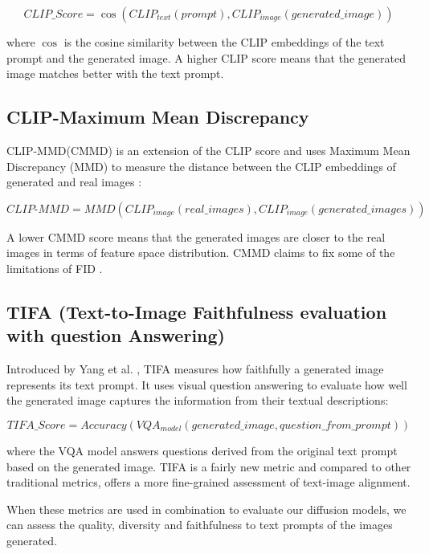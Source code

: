\documentclass{article}
\begin{document}
\begin{equation}
    CLIP\_Score = \cos(CLIP_{text}(prompt), CLIP_{image}(generated\_image))
\end{equation}

where $\cos$ is the cosine similarity between the CLIP embeddings of the text prompt and the generated image.
A higher CLIP score means that the generated image matches better with the text prompt.

\subsection{CLIP-Maximum Mean Discrepancy}

CLIP-MMD(CMMD) is an extension of the CLIP score and uses Maximum Mean Discrepancy (MMD) to measure the distance between the 
CLIP embeddings of generated and real images \cite{gao2022measuring}:

\begin{equation}
    CLIP\text{-}MMD = MMD(CLIP_{image}(real\_images), CLIP_{image}(generated\_images))
\end{equation}

A lower CMMD score means that the generated images are closer to the real images in terms of feature space distribution. CMMD claims to 
fix some of the limitations of FID \cite{rethinkingFID2024}.

\subsection{TIFA (Text-to-Image Faithfulness evaluation with question Answering)}

Introduced by Yang et al. \cite{yang2022empirical}, TIFA measures how faithfully a generated image represents its text prompt.
It uses visual question answering to evaluate how well the generated image captures the information from their textual descriptions:

\begin{equation}
    TIFA\_Score = Accuracy(VQA_{model}(generated\_image, question\_from\_prompt))
\end{equation}

where the VQA model answers questions derived from the original text prompt based on the generated image. 
TIFA is a fairly new metric and compared to other traditional metrics, offers a more fine-grained assessment of text-image alignment.

When these metrics are used in combination to evaluate our diffusion models, we can assess the quality, diversity and faithfulness
to text prompts of the images generated.
\end{document}
